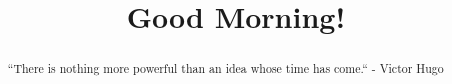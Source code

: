 \documentclass{ximera}
\title{Good Morning!}
\begin{document}
\begin{abstract}
``There is nothing more powerful than an idea whose time has come.`` - Victor Hugo
\end{abstract}
\maketitle
\end{document}
